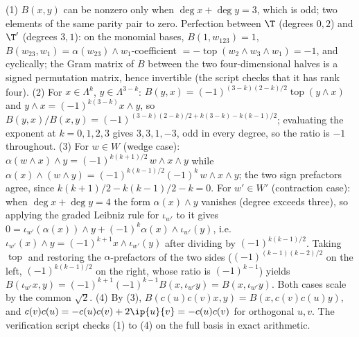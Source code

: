 (1) $B(x,y)$ can be nonzero only when $\deg x + \deg y = 3$, which is odd; two elements of the same parity pair to zero. Perfection between $\T$ (degrees $0,2$) and $\T'$ (degrees $3,1$): on the monomial bases, $B(1, w_{123}) = 1$, $B(w_{23}, w_1) = \alpha(w_{23})\wedge w_1$-coefficient $= -\operatorname{top}(w_2\wedge w_3\wedge w_1) = -1$, and cyclically; the Gram matrix of $B$ between the two four-dimensional halves is a signed permutation matrix, hence invertible (the script checks that it has rank four).
(2) For $x \in \Lambda^k$, $y \in \Lambda^{3-k}$: $B(y,x) = (-1)^{(3-k)(2-k)/2}\operatorname{top}(y \wedge x)$ and $y\wedge x = (-1)^{k(3-k)}x\wedge y$, so $B(y,x)/B(x,y) = (-1)^{(3-k)(2-k)/2 + k(3-k) - k(k-1)/2}$; evaluating the exponent at $k = 0,1,2,3$ gives $3, 3, 1, -3$, odd in every degree, so the ratio is $-1$ throughout.
(3) For $w \in W$ (wedge case): $\alpha(w \wedge x)\wedge y = (-1)^{k(k+1)/2}\,w\wedge x\wedge y$ while $\alpha(x)\wedge(w\wedge y) = (-1)^{k(k-1)/2}(-1)^k\,w\wedge x\wedge y$; the two sign prefactors agree, since $k(k+1)/2 - k(k-1)/2 - k = 0$. For $w' \in W'$ (contraction case): when $\deg x + \deg y = 4$ the form $\alpha(x)\wedge y$ vanishes (degree exceeds three), so applying the graded Leibniz rule for $\iota_{w'}$ to it gives $0 = \iota_{w'}(\alpha(x))\wedge y + (-1)^k \alpha(x)\wedge \iota_{w'}(y)$, i.e.\ $\iota_{w'}(x)\wedge y = (-1)^{k+1} x \wedge \iota_{w'}(y)$ after dividing by $(-1)^{k(k-1)/2}$. Taking $\operatorname{top}$ and restoring the $\alpha$-prefactors of the two sides ($(-1)^{(k-1)(k-2)/2}$ on the left, $(-1)^{k(k-1)/2}$ on the right, whose ratio is $(-1)^{k-1}$) yields $B(\iota_{w'}x, y) = (-1)^{k+1}(-1)^{k-1} B(x, \iota_{w'}y) = B(x, \iota_{w'}y)$. Both cases scale by the common $\sqrt2$.
(4) By (3), $B(c(u)c(v)x, y) = B(x, c(v)c(u)y)$, and $c(v)c(u) = -c(u)c(v) + 2\ip{u}{v} = -c(u)c(v)$ for orthogonal $u, v$. The verification script checks (1) to (4) on the full basis in exact arithmetic.
